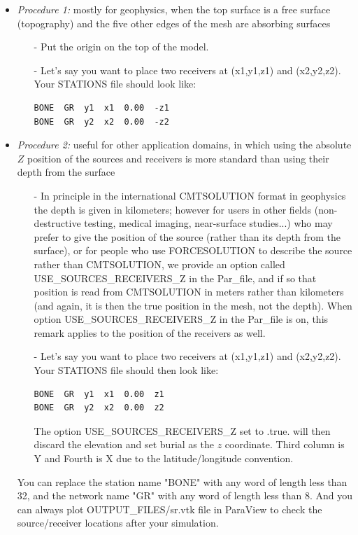 \begin{itemize}
\item {\it Procedure 1:} mostly for geophysics, when the top surface is a free surface (topography) and the five other edges of the mesh are absorbing surfaces
\begin{enumerate}
\item [-] Put the origin on the top of the model.\\
\item [-] Let's say you want to place two receivers at (x1,y1,z1) and
(x2,y2,z2). Your STATIONS file should look like:
{\small \begin{verbatim}
BONE  GR  y1  x1  0.00  -z1
BONE  GR  y2  x2  0.00  -z2
\end{verbatim}}
\end{enumerate}

\item {\it Procedure 2:} useful for other application domains, in which using the absolute $Z$ position of the sources and receivers is more standard than using their depth from the surface
\begin{enumerate}
\item [-] In principle in the international CMTSOLUTION format in geophysics
the depth is given in kilometers; however for users in other fields (non-destructive testing, medical imaging, near-surface studies...) who may prefer to give the position of the source (rather than its depth from the surface), or for people who use FORCESOLUTION to describe the source rather than CMTSOLUTION, we provide an option called USE\_SOURCES\_RECEIVERS\_Z in the Par\_file, and if so that position is read from CMTSOLUTION in meters rather than kilometers (and again, it is then the true position in the mesh, not the depth). When option USE\_SOURCES\_RECEIVERS\_Z in the Par\_file is on, this remark applies to the position of the receivers as well.\\
\item [-] Let's say you want to place two receivers at (x1,y1,z1) and
(x2,y2,z2). Your STATIONS file should then look like:
{\small \begin{verbatim}
BONE  GR  y1  x1  0.00  z1
BONE  GR  y2  x2  0.00  z2
\end{verbatim}}
The option USE\_SOURCES\_RECEIVERS\_Z set to .true. will then discard the elevation and set
burial as the $z$ coordinate.
Third column is Y and Fourth is X due to the latitude/longitude convention.\\
\end{enumerate}

You can replace the station name "BONE" with any word of length less
than 32, and the network name "GR" with any word of length less than
8.
And you can always plot OUTPUT\_FILES/sr.vtk file in ParaView to check the
source/receiver locations after your simulation.\\
\end{itemize}


